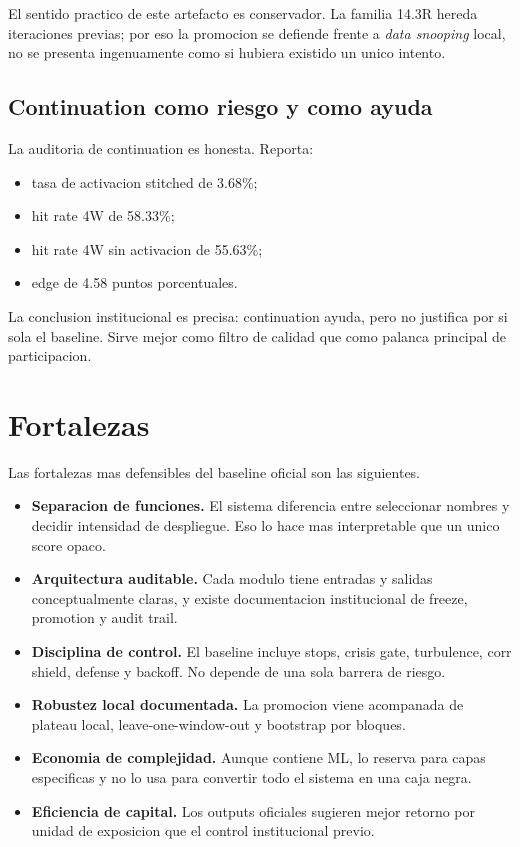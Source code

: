 \documentclass[11pt,letterpaper]{article}
\begin{document}
El sentido practico de este artefacto es conservador. La familia 14.3R hereda iteraciones previas; por eso la promocion se defiende frente a \emph{data snooping} local, no se presenta ingenuamente como si hubiera existido un unico intento.

\subsection{Continuation como riesgo y como ayuda}
La auditoria de continuation es honesta. Reporta:
\begin{itemize}
    \item tasa de activacion stitched de 3.68\%;
    \item hit rate 4W de 58.33\%;
    \item hit rate 4W sin activacion de 55.63\%;
    \item edge de 4.58 puntos porcentuales.
\end{itemize}

La conclusion institucional es precisa: continuation ayuda, pero no justifica por si sola el baseline. Sirve mejor como filtro de calidad que como palanca principal de participacion.

\section{Fortalezas}
Las fortalezas mas defensibles del baseline oficial son las siguientes.

\begin{itemize}
    \item \textbf{Separacion de funciones.} El sistema diferencia entre seleccionar nombres y decidir intensidad de despliegue. Eso lo hace mas interpretable que un unico score opaco.
    \item \textbf{Arquitectura auditable.} Cada modulo tiene entradas y salidas conceptualmente claras, y existe documentacion institucional de freeze, promotion y audit trail.
    \item \textbf{Disciplina de control.} El baseline incluye stops, crisis gate, turbulence, corr shield, defense y backoff. No depende de una sola barrera de riesgo.
    \item \textbf{Robustez local documentada.} La promocion viene acompanada de plateau local, leave-one-window-out y bootstrap por bloques.
    \item \textbf{Economia de complejidad.} Aunque contiene ML, lo reserva para capas especificas y no lo usa para convertir todo el sistema en una caja negra.
    \item \textbf{Eficiencia de capital.} Los outputs oficiales sugieren mejor retorno por unidad de exposicion que el control institucional previo.
\end{itemize}
\end{document}
